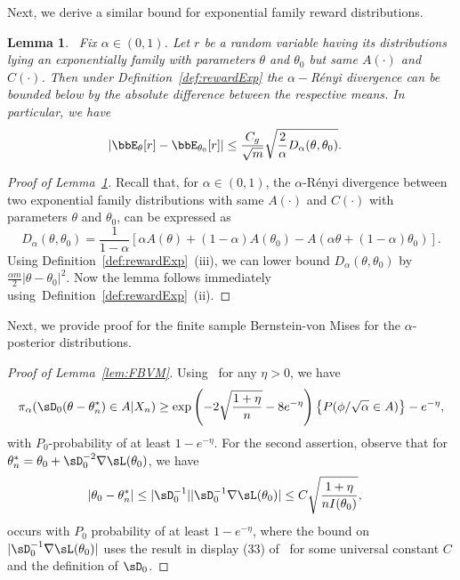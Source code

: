 \documentclass[11pt]{article}
\newtheorem{lemma}[theorem]{Lemma}
\begin{document}
    

Next, we derive a similar bound for exponential family reward distributions.
\begin{lemma}~\label{lem:Exp}
    Fix $\alpha\in (0,1)$. Let $r$ be a random variable having its distributions lying an exponentially family with parameters $\theta$ and $\theta_0$ but same $A(\cdot)$ and $C(\cdot)$. Then under Definition~\ref{def:rewardExp} the $\alpha-$R\'enyi divergence can be bounded below by the absolute difference between the respective means. In particular, we have  
    \begin{align}
        |\bbE_{\theta}[r]-\bbE_{\theta_0}[r]  | &\leq \frac{C_g}{\sqrt{m}} \sqrt{\frac{2}{\alpha} D_{\alpha}(\theta,\theta_0) }.
        \end{align} 
\end{lemma}
\begin{proof}[Proof of Lemma~\ref{lem:Exp}]
        Recall that, for $\alpha\in(0,1)$, the $\alpha$-R\'enyi divergence between two exponential family distributions with same $A(\cdot)$ and $C(\cdot)$ with parameters $\theta$ and $\theta_0$, can be expressed as
        \[D_{\alpha}(\theta,\theta_0) = \frac{1}{1-\alpha}\left[\alpha A(\theta) + (1-\alpha)A(\theta_0 ) - A(\alpha \theta + (1-\alpha)\theta_0 ) \right].
        \]
    Using Definition~\ref{def:rewardExp}~(iii), we can lower bound $D_{\alpha}(\theta,\theta_0)$ by $\frac{\alpha m}{2} |\theta-\theta_0|^2$. Now the lemma follows immediately using~Definition~\ref{def:rewardExp}~(ii).
    
    \end{proof}   

Next, we provide proof for the finite sample Bernstein-von Mises for the $\alpha$-posterior distributions.  
\begin{proof}[Proof of Lemma~\ref{lem:FBVM}]
    Using~\cite[Theorem 4]{Panov2015} for any $\eta >0$, we have %
    \begin{align}
        \pi_{\alpha}(\sD_0(\theta- \theta_n^*)\in A|X_n) \geq \exp\left(-2\sqrt{\frac{1+ \eta}{n}} - 8e^{-\eta}\right) \left\{P(\phi/\sqrt{\alpha} \in A)\right\} -e^{-\eta},
    \end{align}
    with $P_0$-probability of at least $1- e^{-\eta}$. For the second assertion, observe that for $\theta^*_n = \theta_0 + \sD_0^{-2} \nabla\sL(\theta_0)$, we have 
    \begin{align}
    |\theta_0- \theta^*_n|  &\leq  |\sD_0^{-1}||\sD_0^{-1} \nabla\sL(\theta_0)| 
    \leq C\sqrt{\frac{1+\eta}{n I(\theta_0)}},
\end{align}
occurs with $P_0$ probability of at least $1- e^{-\eta}$,
where the bound on $|\sD_0^{-1} \nabla\sL(\theta_0)|$ uses the result in display (33) of~\cite[Theorem 9]{Panov2015} for some universal constant $C$ and the definition of $\sD_0$. 
    
\end{proof}
\end{document}
